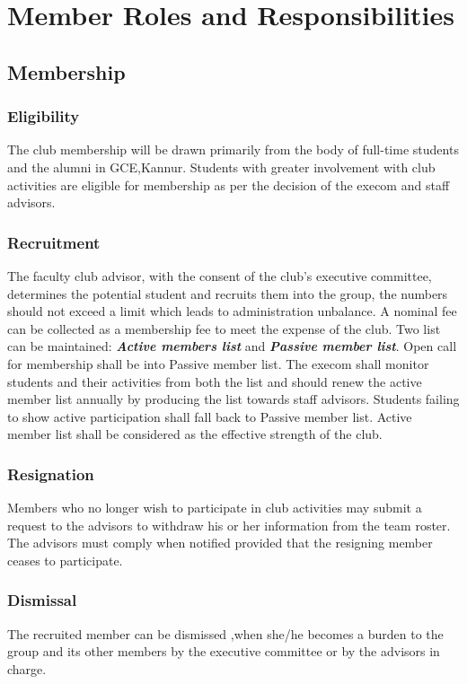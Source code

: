\chapter{Member Roles and Responsibilities}

\section{Membership}

\subsection{Eligibility}
The club membership will be drawn primarily from the body of full-time students and the alumni in GCE,Kannur. Students with greater involvement with club activities are eligible for membership as per the decision of the execom and staff advisors.

\subsection{Recruitment}
The faculty club advisor, with the consent of the club’s executive committee, determines the potential student and recruits them into the group, the numbers should not exceed a limit which leads to administration unbalance. A nominal fee can be collected as a membership fee to meet the expense of the club. Two list can be maintained: \textbf{\textit{Active members list}} and \textbf{\textit{Passive member list}}. Open call for membership shall be into Passive member list. The execom shall monitor students and their activities from both the list and should renew the active member list annually by producing the list towards staff advisors. Students failing to show active participation shall fall back to Passive member list. Active member list shall be considered as the effective strength of the club.

\subsection{Resignation}
Members who no longer wish to participate in club activities may submit a request to the advisors to withdraw his or her information from the team roster. The advisors must comply when notified provided that the resigning member ceases to participate.

\subsection{Dismissal}
The recruited member can be dismissed ,when she/he becomes a burden to the group and its other members by the executive committee or by the advisors in charge.

